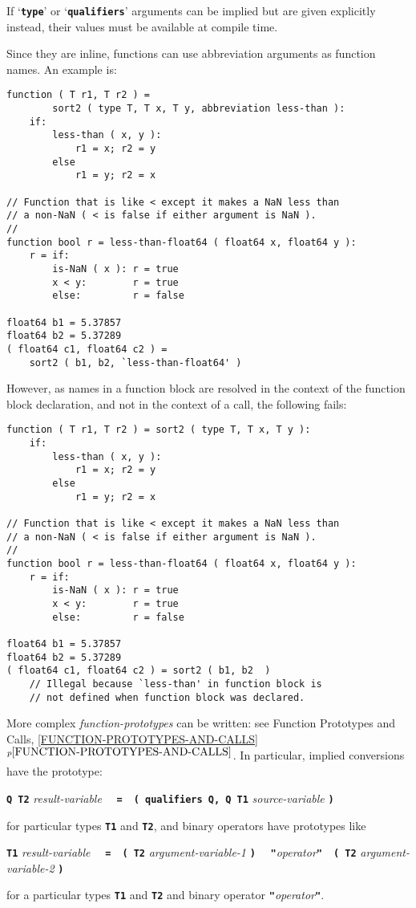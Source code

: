 \documentclass[12pt]{article}
\newcommand{\TT}[1]{{\tt \bfseries #1}}
\newcommand{\itemref}[1]{\ref{#1}$^{p\pageref{#1}}$}
\newenvironment{indpar}[1][0.3in]%
	{\begin{list}{}%
		     {\setlength{\itemsep}{0in}%
		      \setlength{\topsep}{0in}%
		      \setlength{\parsep}{1ex}%
		      \setlength{\labelwidth}{#1}%
		      \setlength{\leftmargin}{#1}%
		      \addtolength{\leftmargin}{\labelsep}}%
	 \item}%
	{\end{list}}
\begin{document}
If `\TT{type}' or `\TT{qualifiers}' arguments can be implied
but are given explicitly instead, their values must be available
at compile time.

Since they are inline, functions can use abbreviation arguments as function
names.  An example is:
\begin{indpar}\begin{verbatim}
function ( T r1, T r2 ) =
        sort2 ( type T, T x, T y, abbreviation less-than ):
    if:
        less-than ( x, y ):
            r1 = x; r2 = y
        else
            r1 = y; r2 = x

// Function that is like < except it makes a NaN less than
// a non-NaN ( < is false if either argument is NaN ).
//
function bool r = less-than-float64 ( float64 x, float64 y ):
    r = if:
        is-NaN ( x ): r = true
        x < y:        r = true
        else:         r = false

float64 b1 = 5.37857
float64 b2 = 5.37289
( float64 c1, float64 c2 ) =
    sort2 ( b1, b2, `less-than-float64' )
\end{verbatim}\end{indpar}

However, as names in a function block are resolved in the context
of the function block declaration, and not in the context of a
call, the following fails:
\begin{indpar}\begin{verbatim}
function ( T r1, T r2 ) = sort2 ( type T, T x, T y ):
    if:
        less-than ( x, y ):
            r1 = x; r2 = y
        else
            r1 = y; r2 = x

// Function that is like < except it makes a NaN less than
// a non-NaN ( < is false if either argument is NaN ).
//
function bool r = less-than-float64 ( float64 x, float64 y ):
    r = if:
        is-NaN ( x ): r = true
        x < y:        r = true
        else:         r = false

float64 b1 = 5.37857
float64 b2 = 5.37289
( float64 c1, float64 c2 ) = sort2 ( b1, b2  )
    // Illegal because `less-than' in function block is
    // not defined when function block was declared.
\end{verbatim}\end{indpar}

More complex {\em function-prototypes} can be written:
see Function Prototypes and Calls, \itemref{FUNCTION-PROTOTYPES-AND-CALLS}.
In particular, implied conversions have the prototype:
\begin{center}
\TT{Q T2} {\em result-variable}%
    ~~\TT{=}~~\TT{( qualifiers Q, Q T1} {\em source-variable} \TT{)}
\end{center}
for particular types \TT{T1} and \TT{T2}, and binary operators have prototypes
like
\begin{center}
\TT{T1} {\em result-variable}%
    ~~\TT{=}~~\TT{( T2} {\em argument-variable-1} \TT{)}
    ~~\TT{"}{\em operator}\TT{"}~~\TT{( T2} {\em argument-variable-2} \TT{)}
\end{center}
for a particular types \TT{T1} and \TT{T2}
and binary operator \TT{"}{\em operator}\TT{"}.
\end{document}
